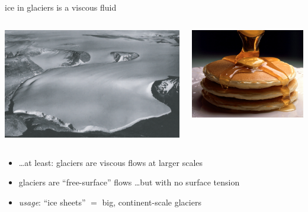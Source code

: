 \documentclass[hide notes,intlimits]{beamer}
\begin{document}
\begin{frame}{ice in glaciers is a viscous fluid}
\begin{columns}
\begin{column}{0.65\textwidth}
\includegraphics[width=1.0\textwidth]{polaris}
\end{column}
\begin{column}{0.35\textwidth}
\includegraphics[width=1.0\textwidth]{pancakes}
\end{column}
\end{columns}

\bigskip\bigskip
\begin{itemize}
\item \dots at least: glaciers are viscous flows at larger scales
\item glaciers are ``free-surface'' flows \dots but with no surface tension
\item \emph{usage}: ``ice sheets'' $=$ big, continent-scale glaciers
\end{itemize}
\end{frame}
\end{document}
